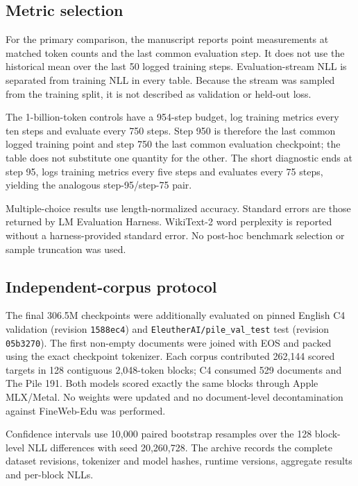 \documentclass[11pt]{article}
\begin{document}
\subsection*{Metric selection}

For the primary comparison, the manuscript reports point measurements at matched token counts and the last common evaluation step. It does not use the historical mean over the last 50 logged training steps. Evaluation-stream NLL is separated from training NLL in every table. Because the stream was sampled from the training split, it is not described as validation or held-out loss.

The 1-billion-token controls have a 954-step budget, log training metrics every ten steps and evaluate every 750 steps. Step 950 is therefore the last common logged training point and step 750 the last common evaluation checkpoint; the table does not substitute one quantity for the other. The short diagnostic ends at step 95, logs training metrics every five steps and evaluates every 75 steps, yielding the analogous step-95/step-75 pair.

Multiple-choice results use length-normalized accuracy. Standard errors are those returned by LM Evaluation Harness. WikiText-2 word perplexity is reported without a harness-provided standard error. No post-hoc benchmark selection or sample truncation was used.

\subsection*{Independent-corpus protocol}

The final 306.5M checkpoints were additionally evaluated on pinned English C4 validation (revision \texttt{1588ec4}) and \texttt{EleutherAI/pile\_val\_test} test (revision \texttt{05b3270}). The first non-empty documents were joined with EOS and packed using the exact checkpoint tokenizer. Each corpus contributed 262,144 scored targets in 128 contiguous 2,048-token blocks; C4 consumed 529 documents and The Pile 191. Both models scored exactly the same blocks through Apple MLX/Metal. No weights were updated and no document-level decontamination against FineWeb-Edu was performed.

Confidence intervals use 10,000 paired bootstrap resamples over the 128 block-level NLL differences with seed 20,260,728. The archive records the complete dataset revisions, tokenizer and model hashes, runtime versions, aggregate results and per-block NLLs.
\end{document}
